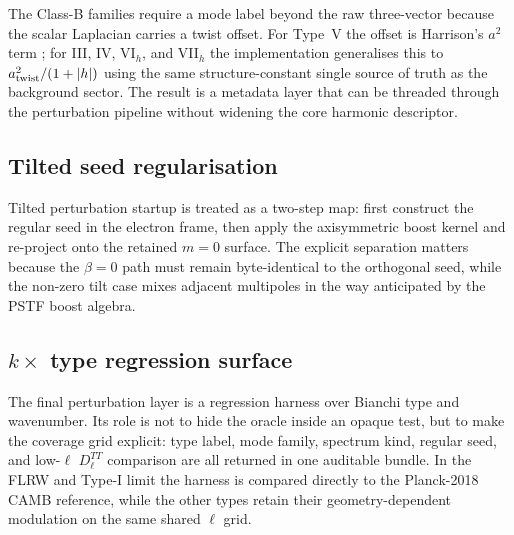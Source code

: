 The Class-B families require a mode label beyond the raw
three-vector because the scalar Laplacian carries a twist offset.
For Type~V the offset is Harrison's $a^2$ term
\cite{Harrison1967}; for III, IV, VI$_h$, and VII$_h$ the
implementation generalises this to $a_{\rm twist}^2/(1+|h|)$
using the same structure-constant single source of truth as the
background sector.  The result is a metadata layer that can be
threaded through the perturbation pipeline without widening the
core harmonic descriptor.

\subsection{Tilted seed regularisation}

Tilted perturbation startup is treated as a two-step map: first
construct the regular seed in the electron frame, then apply the
axisymmetric boost kernel and re-project onto the retained
$m=0$ surface.  The explicit separation matters because the
$\beta = 0$ path must remain byte-identical to the orthogonal
seed, while the non-zero tilt case mixes adjacent multipoles in
the way anticipated by the PSTF boost algebra.

\subsection{$k \times$ type regression surface}

The final perturbation layer is a regression harness over
Bianchi type and wavenumber.  Its role is not to hide the oracle
inside an opaque test, but to make the coverage grid explicit:
type label, mode family, spectrum kind, regular seed, and
low-$\ell$ $D_\ell^{TT}$ comparison are all returned in one
auditable bundle.  In the FLRW and Type-I limit the harness is
compared directly to the Planck-2018 CAMB reference, while the
other types retain their geometry-dependent modulation on the
same shared $\ell$ grid.










